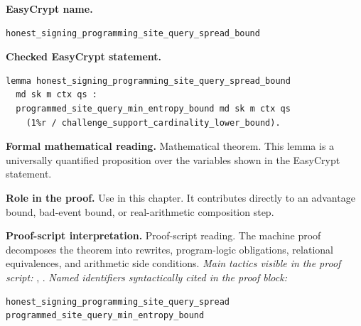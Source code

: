 \begin{formaltheorem}
\noindent\textbf{EasyCrypt name.}
\begin{lstlisting}[language=EasyCrypt,basicstyle=\ttfamily\scriptsize]
honest_signing_programming_site_query_spread_bound
\end{lstlisting}
\noindent\textbf{Checked EasyCrypt statement.}
\begin{lstlisting}[language=EasyCrypt,basicstyle=\ttfamily\scriptsize]
lemma honest_signing_programming_site_query_spread_bound
  md sk m ctx qs :
  programmed_site_query_min_entropy_bound md sk m ctx qs
    (1%r / challenge_support_cardinality_lower_bound).
\end{lstlisting}
\noindent\textbf{Formal mathematical reading.}
Mathematical theorem. This lemma is a universally quantified proposition over the variables shown in the EasyCrypt statement.

\noindent\textbf{Role in the proof.}
Use in this chapter. It contributes directly to an advantage bound, bad-event bound, or real-arithmetic composition step.

\noindent\textbf{Proof-script interpretation.}
Proof-script reading. The machine proof decomposes the theorem into rewrites, program-logic obligations, relational equivalences, and arithmetic side conditions.
\emph{Main tactics visible in the proof script:} , .
\emph{Named identifiers syntactically cited in the proof block:}
\begin{lstlisting}[language=EasyCrypt,basicstyle=\ttfamily\scriptsize]
honest_signing_programming_site_query_spread
programmed_site_query_min_entropy_bound
\end{lstlisting}

\end{formaltheorem}

